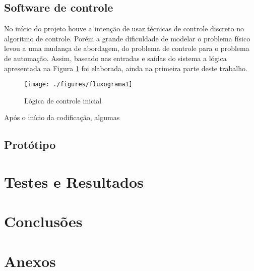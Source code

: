 \documentclass[a4paper,11pt]{article}
\begin{document}
%
\subsection{Software de controle}
\label{sec:software}
No início do projeto houve a intenção de usar técnicas de controle discreto no algoritmo de controle.
Porém a grande dificuldade de modelar o problema físico levou a uma mudança de abordagem, do problema de controle para o problema de automação. Assim, baseado nas entradas e saídas do sistema a lógica apresentada na Figura \ref{fig: fluxograma1} foi elaborada, ainda na primeira parte deste trabalho. 
\begin{figure}[!h]
 \begin{center}
  \texttt{[image: ./figures/fluxograma1]}
 \end{center}
 \caption{Lógica de controle inicial}
 \label{fig: fluxograma1}
\end{figure}
Após o início da codificação, algumas 

 
%
\subsection{Protótipo}
\label{sec:prototipo}


\pagebreak
%
\section{Testes e Resultados}
\label{sec:resultados}

\pagebreak
%
\section{Conclusões}
\label{sec:conclusoes}


\pagebreak
%
\section{Anexos}
\label{sec:anexos}

%
\end{document}
